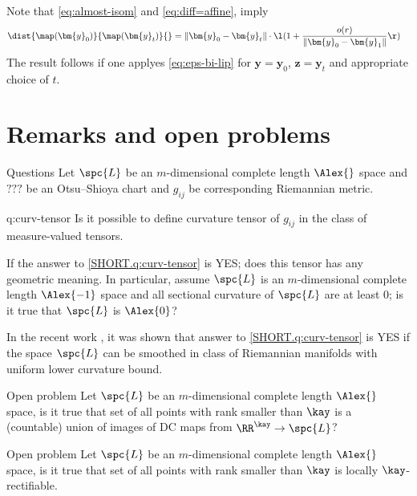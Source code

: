 Note that \ref{eq:almost-isom} and \ref{eq:diff=affine}, imply 
\[
\begin{aligned}
\dist{\map(\bm{y}_0)}{\map(\bm{y}_t)}{}
&= \|\bm{y}_0-\bm{y}_t\|\cdot
\l(
1+\frac{o(r)}{\|\bm{y}_0-\bm{y}_1\|} 
\r)
\end{aligned}
\]
The result follows if one applyes \ref{eq:eps-bi-lip}
for $\bm{y}=\bm{y}_0$, $\bm{z}=\bm{y}_t$ and appropriate choice of $t$.
\qeds


\section{Remarks and open problems}

\begin{thm}{Questions}
Let $\spc{L}$ be an $m$-dimensional complete length $\Alex{}$ space and $???$ be an Otsu--Shioya chart
and $g_{ij}$ be corresponding Riemannian metric.
\begin{subthm}{q:curv-tensor}
Is it possible to define curvature tensor of $g_{ij}$ 
in the class of measure-valued tensors.
\end{subthm}

\begin{subthm}{} If the answer to \ref{SHORT.q:curv-tensor} is YES;
does this tensor has any geometric meaning.
In particular, assume $\spc{L}$ is an $m$-dimensional complete length $\Alex{-1}$ space and all sectional curvature of $\spc{L}$ are at least $0$; 
is it true that $\spc{L}$ is $\Alex{0}$?
\end{subthm}
\end{thm}

In the recent work \cite{lebedeva-curv}, it was shown that answer to \ref{SHORT.q:curv-tensor} is YES if the space $\spc{L}$ can be smoothed in class of Riemannian manifolds with uniform lower curvature bound.


\begin{thm}{Open problem}
Let $\spc{L}$ be an $m$-dimensional complete length $\Alex{}$ space,
is it true that set of all points with rank smaller than $\kay$ is a (countable) union of images of DC maps from $\RR^\kay\to\spc{L}$? 
\end{thm}

\begin{thm}{Open problem}
Let $\spc{L}$ be an $m$-dimensional complete length $\Alex{}$ space,
is it true that set of all points with rank smaller than $\kay$ is locally $\kay$-rectifiable.
\end{thm}



